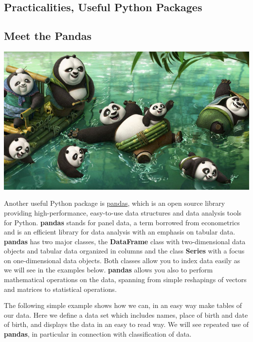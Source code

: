\documentclass[%
oneside,                 %
final,                   %
10pt]{article}
\begin{document}
\subsection*{Practicalities, Useful Python Packages}


\subsection*{Meet the Pandas}




\vspace{6mm}

\centerline{\includegraphics[width=0.8\linewidth]{fig/pandas.jpg}}

\vspace{6mm}



Another useful Python package is
\href{{https://pandas.pydata.org/}}{pandas}, which is an open source library
providing high-performance, easy-to-use data structures and data
analysis tools for Python. \textbf{pandas} stands for panel data, a term borrowed from econometrics and is an efficient library for data analysis with an emphasis on tabular data.
\textbf{pandas} has two major classes, the \textbf{DataFrame} class with two-dimensional data objects and tabular data organized in columns and the class \textbf{Series} with a focus on one-dimensional data objects. Both classes allow you to index data easily as we will see in the examples below. 
\textbf{pandas} allows you also to perform mathematical operations on the data, spanning from simple reshapings of vectors and matrices to statistical operations. 

The following simple example shows how we can, in an easy way make tables of our data. Here we define a data set which includes names, place of birth and date of birth, and displays the data in an easy to read way. We will see repeated use of \textbf{pandas}, in particular in connection with classification of data. 
\end{document}
